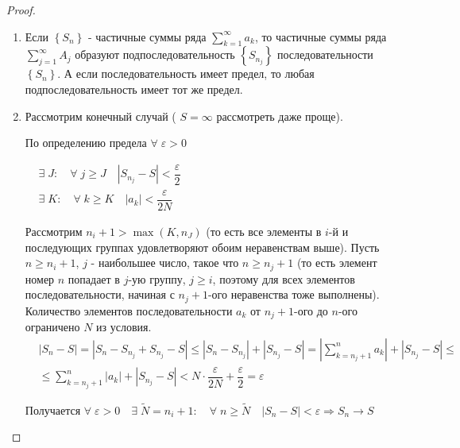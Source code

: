 \documentclass[../main.tex]{subfiles}
\begin{document}
\begin{proof}
    
    ~

    \begin{enumerate}
        \item Если \( \left\{ S_n\right\}\) - частичные суммы ряда \( \sum\limits_{ k=1}^{ \infty } a_k\), то частичные суммы ряда \( \sum\limits_{ j=1}^{ \infty } A_j\) образуют подпоследовательность \( \left\{ S_{n_j}\right\}\) последовательности \( \left\{ S_n\right\}\). А если последовательность имеет предел, то любая подпоследовательность имеет тот же предел.
        \item Рассмотрим конечный случай ( \( S= \infty \) рассмотреть даже проще).
        \par По определению предела \( \forall \; \varepsilon >0\) \par 
        \( \begin{aligned}
            &\exists \; J:\quad \forall \; j \geq  J\quad \left| S_{n_j}-S\right|< \dfrac{ \varepsilon}{ 2}\\ 
            &\exists \; K:\quad \forall \; k \geq  K\quad \left| a_k\right| < \dfrac{ \varepsilon}{ 2N} 
        \end{aligned}\)
        \par Рассмотрим \( n_i + 1> \max\limits_{ } (K, n_{J})\) (то есть все элементы в \(i\)-й и последующих группах удовлетворяют обоим неравенствам выше). Пусть \( n \geq n_i+1\), \( j\) - наибольшее число, такое что \( n \geq n_j+1\) (то есть элемент номер \( n\) попадает в \( j\)-ую группу, \( j \geq i\), поэтому для всех элементов последовательности, начиная с \( n_j+1\)-ого неравенства тоже выполнены). Количество элементов последовательности \( a_k\) от \( n_{j}+1\)-ого до \( n\)-ого ограничено \( N\) из условия. 
        \begin{equation*}
            \begin{aligned}
                &\left| S_n-S\right|=\left| S_n-S_{n_j}+S_{n_j}-S\right| \leq \left| S_n-S_{n_j}\right|+\left| S_{n_j}-S\right|= \left|\sum\limits_{ k=n_{j}+1}^{ n} a_k \right| + \left| S_{n_j}-S\right| \leq \\ 
                & \leq \sum\limits_{ k=n_{j}+1}^{ n} \left| a_k\right| + \left| S_{n_j}-S\right| < N\cdot \dfrac{ \varepsilon}{ 2N} + \dfrac{ \varepsilon}{ 2} = \varepsilon   
            \end{aligned}
        \end{equation*}
        \par Получается \( \forall \; \varepsilon >0\quad \exists \; \tilde{ N}=n_i+1:\quad \forall \; n \geq \tilde{ N}\quad \left| S_n-S\right|< \varepsilon \Longrightarrow S_n \longrightarrow S\)

\end{enumerate}
\end{proof}
\end{document}
